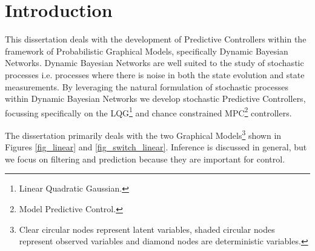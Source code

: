 \chapter{Introduction}
This dissertation deals with the development of Predictive Controllers within the framework of Probabilistic Graphical Models, specifically Dynamic Bayesian Networks. Dynamic Bayesian Networks are well suited to the study of stochastic processes i.e. processes where there is noise in both the state evolution and state measurements. By leveraging the natural formulation of stochastic processes within Dynamic Bayesian Networks we develop stochastic Predictive Controllers, focussing specifically on the LQG\footnote{Linear Quadratic Gaussian.} and chance constrained MPC\footnote{Model Predictive Control.} controllers.

The dissertation primarily deals with the two Graphical Models\footnote{Clear circular nodes represent latent variables, shaded circular nodes represent observed variables and diamond nodes are deterministic variables.} shown in Figures \ref{fig_linear} and \ref{fig_switch_linear}. Inference is discussed in general, but we focus on filtering and prediction because they are important for control. 
